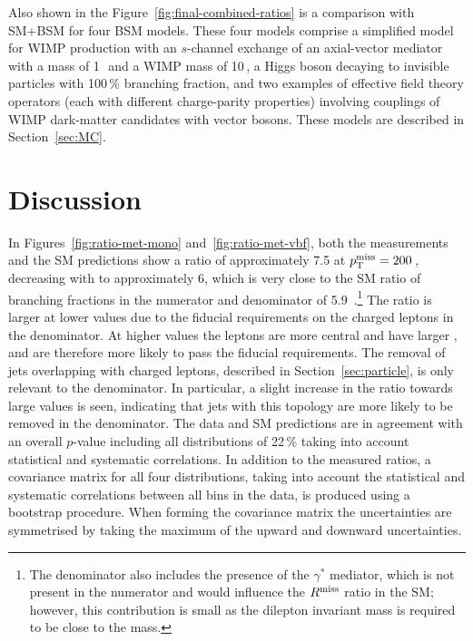 \documentclass[cernpreprint,txfonts,UKenglish,texlive=2016]{\ATLASLATEXPATH atlasdoc}
\begin{document}
Also shown in the Figure~\ref{fig:final-combined-ratios} is a comparison with SM+BSM for
four BSM models. These four models comprise a simplified model for WIMP production with 
an $s$-channel exchange of an axial-vector mediator with a mass of 1\,\TeV\ and a
WIMP mass of 10\,\GeV, a Higgs boson decaying to invisible particles with 100\,\% branching fraction, 
and two examples of effective field theory operators 
(each with different charge-parity properties) involving couplings of WIMP dark-matter candidates
with vector bosons. These models are described in Section~\ref{sec:MC}.

\section{Discussion}
\label{sec:discuss}

In Figures~\ref{fig:ratio-met-mono} and~\ref{fig:ratio-met-vbf}, both the measurements and the SM predictions 
show a ratio \Rmiss{} of approximately 7.5 at $p_\mathrm{T}^\mathrm{miss}{} = 200$\,\GeV, decreasing with \ptmiss{} to approximately 6,
which is very close to the SM ratio of branching fractions in the numerator and denominator 
of 5.9~\cite{Olive:2016xmw}.\footnote{The denominator also includes the presence of 
the $\gamma^*$ mediator, which is not present in the numerator and would influence 
the $R^{\mathrm{miss}}$ ratio in the SM; however, this contribution is small as the dilepton invariant 
mass is required to be close to the \Z{} mass.} 
The ratio is larger at lower \ptmiss{} values
due to the fiducial requirements on the charged leptons in the
denominator. 
At higher \ptmiss{} values the leptons are more 
central and have larger \pt{}, and are therefore more likely to pass
the fiducial requirements. The removal of jets overlapping with
charged leptons, described in Section~\ref{sec:particle}, is only
relevant to the denominator. In particular, a slight increase in the ratio towards large
\dphijj{} values is seen, indicating that jets with this topology are more likely to be
removed in the denominator.
The data and SM predictions are in agreement with an overall $p$-value including all distributions of 22\,\%
taking into account statistical and systematic correlations. 
In addition to
the measured ratios, a covariance matrix for all four
distributions, taking into account the statistical and systematic correlations
between all bins in the data, is produced using a bootstrap procedure. When forming the covariance
matrix the uncertainties are symmetrised by taking the maximum of the
upward and downward uncertainties.
\end{document}
